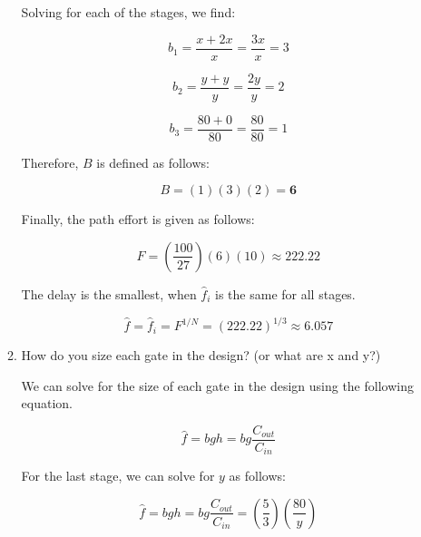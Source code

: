 \documentclass[fleqn]{article}
\begin{document}
\begin{enumerate}
\begin{enumerate}
				Solving for each of the stages, we find:
				
				\begin{equation*}
					b_1 = \frac{x + 2x}{x} = \frac{3x}{x} = 3
				\end{equation*}
				
				\begin{equation*}
					b_2 = \frac{y + y}{y} = \frac{2y}{y} = 2
				\end{equation*}
				
				\begin{equation*}
					b_3 = \frac{80 + 0}{80} = \frac{80}{80} = 1
				\end{equation*}
				
				Therefore, $B$ is defined as follows:
				
				\begin{equation*}
					B = (1)(3)(2) = \mathbf{6}
				\end{equation*}
				
				Finally, the path effort is given as follows:
				
				\begin{equation*}
					F = \left(\frac{100}{27}\right)\left(6\right)\left(10\right) \approx \mathbf{222.22}
				\end{equation*}
				
				The delay is the smallest, when $\hat{f}_i$ is the same for all stages.
				
				\begin{equation*}
					\hat{f} = \hat{f}_i = F^{1/N} = (222.22)^{1/3} \approx \mathbf{6.057}
				\end{equation*}
					
				\item How do you size each gate in the design? (or what are x and y?)
			
				We can solve for the size of each gate in the design using the following equation.
				
				\begin{equation*}
					\hat{f} = bgh = bg\frac{C_{out}}{C_{in}}
				\end{equation*}
				
				For the last stage, we can solve for $y$ as follows:
				
				\begin{equation*}
					\hat{f} = bgh = bg\frac{C_{out}}{C_{in}} = \left(\frac{5}{3}\right)\left(\frac{80}{y}\right)
				\end{equation*}
				

\end{enumerate}
\end{enumerate}
\end{document}
